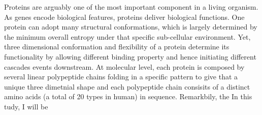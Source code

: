 Proteins are arguably one of the most important component in a living organism. As genes encode biological features, proteins deliver biological functions. One protein can adopt many structural conformations, which is largely determined by the minimum overall entropy under that specific sub-cellular environment. Yet, three dimensional conformation and flexibility of a protein determine its functionality by allowing different binding property and hence initiating different cascades events downstream. At molecular level, each protein is composed by several linear polypeptide chains folding in a specific pattern to give that a unique three dimetnial shape and each polypeptide chain consisits of a distinct amino acids (a total of 20 types in human) in sequence. Remarkbily, the  In this tudy, I will be 